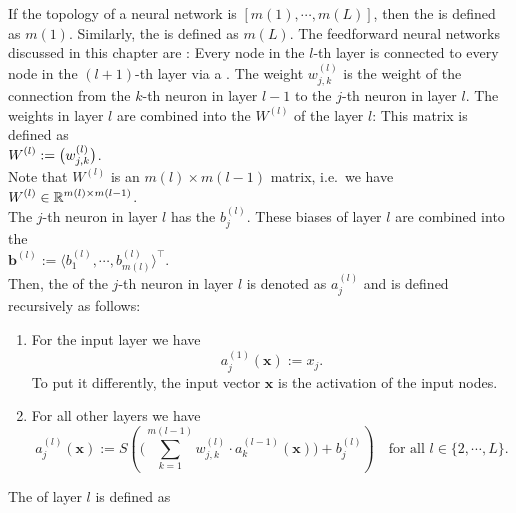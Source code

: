 If the topology of a neural network is  $[m(1), \cdots, m(L)]$, then  the  is defined as
$m(1)$.  Similarly, the  is defined as $m(L)$.
The feedforward neural networks discussed in this chapter are :  Every node in the $l$-th
layer is connected to every node in the $(l+1)$-th layer via a . 
The weight $w_{j,k}^{(l)}$ is the weight of the connection from the $k$-th neuron in layer $l-1$ to
the $j$-th neuron in layer $l$.  The weights in layer $l$ are combined into the  $W^{(l)}$ of
the layer $l$: This matrix is defined as
\\[0.2cm]
\hspace*{1.3cm}
$\displaystyle W^{(l)} := \bigl( w_{j,k}^{(l)} \bigr)$.
\\[0.2cm]
Note that $W^{(l)}$ is an $m(l) \times m(l-1)$ matrix, i.e.~we have
\\[0.2cm]
\hspace*{1.3cm}
$\displaystyle W^{(l)} \in \mathbb{R}^{m(l) \times m(l-1)}$.
\\[0.2cm]
The $j$-th neuron in layer $l$ has the  $b_j^{(l)}$.  These biases of layer $l$ are combined into
the 
\\[0.2cm]
\hspace*{1.3cm}
$\mathbf{b}^{(l)} := \langle b_1^{(l)}, \cdots, b_{m(l)}^{(l)} \rangle^\top$.
\\[0.2cm]
Then, the  of the $j$-th neuron
in layer $l$ is denoted as $a_j^{(l)}$ and is defined recursively as follows:
\begin{enumerate}
\item For the input layer we have
      \begin{equation}
        \label{eq:feedforward1}
       a^{(1)}_j(\mathbf{x}) := x_j.
       \tag{FF1}
      \end{equation}
      To put it differently, the input vector $\mathbf{x}$ is the activation of the input nodes.
\item For all other layers we have
      \begin{equation}
         \label{eq:feedforward2}
         a_j^{(l)}(\mathbf{x}) := 
             S\left(\Biggl(\sum\limits_{k=1}^{m(l-1)} w_{j,k}^{(l)}\cdot a_k^{(l-1)}(\mathbf{x})\Biggr) + b_{j}^{(l)}\right) 
        \quad \mbox{for all $l \in \{2, \cdots, L\}$}.
       \tag{FF2}
\end{equation}
\end{enumerate}
The  of layer $l$ is defined as

